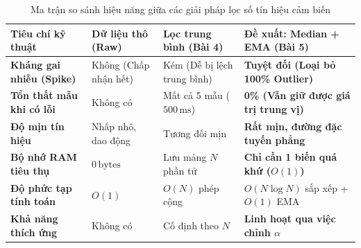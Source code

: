\begin{table}[h!]
\centering
\small
\begin{tabularx}{\textwidth}{|>{\raggedright\arraybackslash}p{3.0cm}|>{\raggedright\arraybackslash}X|>{\raggedright\arraybackslash}X|>{\raggedright\arraybackslash}X|}
\hline
\textbf{Tiêu chí kỹ thuật} & \textbf{Dữ liệu thô (Raw)} & \textbf{Lọc trung bình (Bài 4)} & \textbf{Đề xuất: Median + EMA (Bài 5)} \\
\hline
\textbf{Kháng gai nhiễu (Spike)} & Không (Chấp nhận hết) & Kém (Dễ bị lệch trung bình) & \textbf{Tuyệt đối (Loại bỏ 100\% Outlier)} \\
\textbf{Tổn thất mẫu khi có lỗi} & Không có & Mất cả 5 mẫu ($500\,\text{ms}$) & \textbf{0\% (Vẫn giữ được giá trị trung vị)} \\
\textbf{Độ mịn tín hiệu} & Nhấp nhô, dao động & Tương đối mịn & \textbf{Rất mịn, đường đặc tuyến phẳng} \\
\textbf{Bộ nhớ RAM tiêu thụ} & $0\,\text{bytes}$ & Lưu mảng $N$ phần tử & \textbf{Chỉ cần 1 biến quá khứ ($O(1)$)} \\
\textbf{Độ phức tạp tính toán} & $O(1)$ & $O(N)$ phép cộng & $O(N \log N)$ sắp xếp + $O(1)$ EMA \\
\textbf{Khả năng thích ứng} & Không có & Cố định theo $N$ & \textbf{Linh hoạt qua việc chỉnh $\alpha$} \\
\hline
\end{tabularx}
\vspace{0.2cm}
\caption{Ma trận so sánh hiệu năng giữa các giải pháp lọc số tín hiệu cảm biến}
\label{tab:filter_comparison}
\end{table}

\vspace{0.2cm}
